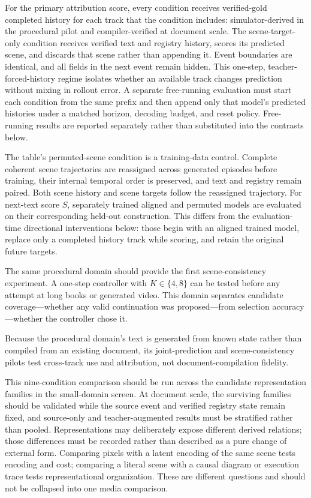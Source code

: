 \documentclass[11pt]{article}
\begin{document}
For the primary attribution score, every condition receives verified-gold completed history for each track that the condition includes: simulator-derived in the procedural pilot and compiler-verified at document scale. The scene-target-only condition receives verified text and registry history, scores its predicted scene, and discards that scene rather than appending it. Event boundaries are identical, and all fields in the next event remain hidden. This one-step, teacher-forced-history regime isolates whether an available track changes prediction without mixing in rollout error. A separate free-running evaluation must start each condition from the same prefix and then append only that model's predicted histories under a matched horizon, decoding budget, and reset policy. Free-running results are reported separately rather than substituted into the contrasts below.

The table's permuted-scene condition is a training-data control. Complete coherent scene trajectories are reassigned across generated episodes before training, their internal temporal order is preserved, and text and registry remain paired. Both scene history and scene targets follow the reassigned trajectory. For next-text score $S$, separately trained aligned and permuted models are evaluated on their corresponding held-out construction. This differs from the evaluation-time directional interventions below: those begin with an aligned trained model, replace only a completed history track while scoring, and retain the original future targets.

The same procedural domain should provide the first scene-consistency experiment. A one-step controller with $K\in\{4,8\}$ can be tested before any attempt at long books or generated video. This domain separates candidate coverage---whether any valid continuation was proposed---from selection accuracy---whether the controller chose it.

Because the procedural domain's text is generated from known state rather than compiled from an existing document, its joint-prediction and scene-consistency pilots test cross-track use and attribution, not document-compilation fidelity.

This nine-condition comparison should be run across the candidate representation families in the small-domain screen. At document scale, the surviving families should be validated while the source event and verified registry state remain fixed, and source-only and teacher-augmented results must be stratified rather than pooled. Representations may deliberately expose different derived relations; those differences must be recorded rather than described as a pure change of external form. Comparing pixels with a latent encoding of the same scene tests encoding and cost; comparing a literal scene with a causal diagram or execution trace tests representational organization. These are different questions and should not be collapsed into one media comparison.
\end{document}
